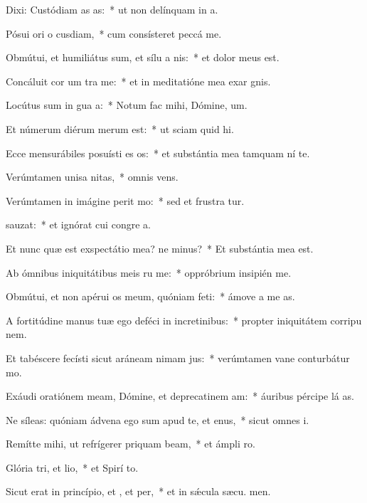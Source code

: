 \item Dixi: Custódiam as as:~* ut non delínquam in  a.
\item Pósui ori o cusdiam,~* cum consísteret peccá  me.
\item Obmútui, et humiliátus sum, et sílu a nis:~* et dolor meus  est.
\item Concáluit cor um tra me:~* et in meditatióne mea exar gnis.
\item Locútus sum in gua a:~* Notum fac mihi, Dómine,  um.
\item Et númerum diérum merum  est:~* ut sciam quid  hi.
\item Ecce mensurábiles posuísti es os:~* et substántia mea tamquam ní  te.
\item Verúmtamen unisa nitas,~* omnis  vens.
\item Verúmtamen in imágine perit mo:~* sed et frustra tur.
\item {}sauzat:~* et ignórat cui congre a.
\item Et nunc quæ est exspectátio mea? ne minus?~* Et substántia mea   est.
\item Ab ómnibus iniquitátibus meis ru me:~* oppróbrium insipién  me.
\item Obmútui, et non apérui os meum, quóniam  feti:~* ámove a me  as.
\item A fortitúdine manus tuæ ego deféci in incretinibus:~* propter iniquitátem corripu nem.
\item Et tabéscere fecísti sicut aráneam nimam jus:~* verúmtamen vane conturbátur  mo.
\item Exáudi oratiónem meam, Dómine, et deprecatinem am:~* áuribus pércipe lá as.
\item Ne síleas: quóniam ádvena ego sum apud te, et enus,~* sicut omnes  i.
\item Remítte mihi, ut refrígerer priquam beam,~* et ámpli  ro.
\item Glória tri, et lio,~* et Spirí to.
\item Sicut erat in princípio, et , et per,~* et in sǽcula sæcu. men.
